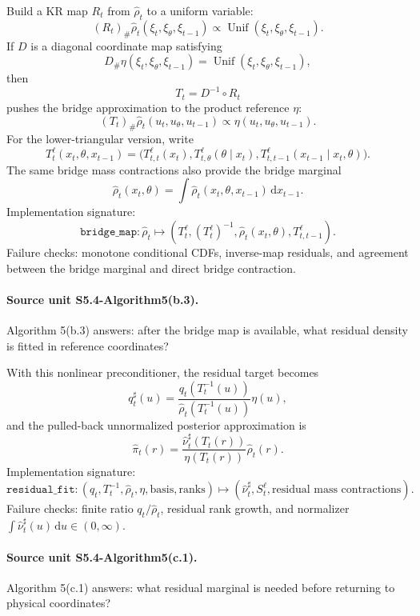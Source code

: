 \documentclass[11pt]{article}
\newcommand{\dd}{\,\mathrm d}
\begin{document}
Build a KR map \(R_t\) from \(\widehat\rho_t\) to a uniform variable:
\[
    (R_t)_\#\widehat\rho_t(\xi_t,\xi_\theta,\xi_{t-1})
    \propto
    \operatorname{Unif}(\xi_t,\xi_\theta,\xi_{t-1}).
    \tag{P8}
\]
If \(D\) is a diagonal coordinate map satisfying
\[
    D_\#\eta(\xi_t,\xi_\theta,\xi_{t-1})
    =
    \operatorname{Unif}(\xi_t,\xi_\theta,\xi_{t-1}),
    \tag{P9}
\]
then
\[
    T_t=D^{-1}\circ R_t
    \tag{P10}
\]
pushes the bridge approximation to the product reference \(\eta\):
\[
    (T_t)_\#\widehat\rho_t(u_t,u_\theta,u_{t-1})
    \propto
    \eta(u_t,u_\theta,u_{t-1}).
    \tag{P11}
\]
For the lower-triangular version, write
\[
    T_t^{\ell}(x_t,\theta,x_{t-1})
    =
    \bigl(
    T_{t,t}^{\ell}(x_t),
    T_{t,\theta}^{\ell}(\theta\mid x_t),
    T_{t,t-1}^{\ell}(x_{t-1}\mid x_t,\theta)
    \bigr).
    \tag{P11a}
\]
The same bridge mass contractions also provide the bridge marginal
\[
    \widehat\rho_t(x_t,\theta)
    =
    \int\widehat\rho_t(x_t,\theta,x_{t-1})\dd x_{t-1}.
    \tag{P11b}
\]
Implementation signature:
\[
    \texttt{bridge\_map}
    :
    \widehat\rho_t
    \mapsto
    (T_t^\ell,(T_t^\ell)^{-1},\widehat\rho_t(x_t,\theta),
    T_{t,t-1}^\ell).
    \tag{P11c}
\]
Failure checks: monotone conditional CDFs, inverse-map residuals, and agreement
between the bridge marginal and direct bridge contraction.

\paragraph{Source unit S5.4-Algorithm5(b.3).}
Algorithm 5(b.3) answers: after the bridge map is available, what residual
density is fitted in reference coordinates?

With this nonlinear preconditioner, the residual target becomes
\[
    q^\sharp_t(u)
    =
    \frac{q_t(T_t^{-1}(u))}
    {\widehat\rho_t(T_t^{-1}(u))}
    \eta(u),
    \tag{P12}
\]
and the pulled-back unnormalized posterior approximation is
\[
    \widehat\pi_t(r)
    =
    \frac{\widehat\nu^\sharp_t(T_t(r))}
    {\eta(T_t(r))}
    \widehat\rho_t(r).
    \tag{P13}
\]
Implementation signature:
\[
    \texttt{residual\_fit}
    :
    (q_t,T_t^{-1},\widehat\rho_t,\eta,\text{basis},\text{ranks})
    \mapsto
    (\widehat\nu_t^\sharp,S_t^\ell,\text{residual mass contractions}).
    \tag{P13a}
\]
Failure checks: finite ratio \(q_t/\widehat\rho_t\), residual rank growth, and
normalizer \(\int\widehat\nu_t^\sharp(u)\dd u\in(0,\infty)\).

\paragraph{Source unit S5.4-Algorithm5(c.1).}
Algorithm 5(c.1) answers: what residual marginal is needed before returning to
physical coordinates?
\end{document}
